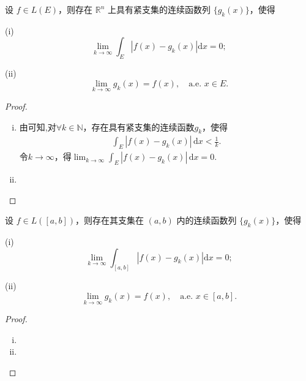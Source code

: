 \documentclass[../../main.tex]{subfiles}
\begin{document}
\begin{corollary}
设 \( f \in L(E) \)，则存在 \( \mathbb{R}^n \) 上具有紧支集的连续函数列 \( \{ g_k(x) \} \)，使得

(i)
\[
\lim_{k \to \infty} \int_E |f(x) - g_k(x)| \mathrm{d}x = 0;
\]

(ii)
\[
\lim_{k \to \infty} g_k(x) = f(x), \quad \text{a.e. } x \in E.
\]
\end{corollary}
\begin{proof}
\begin{enumerate}[(i)]
\item 由可知,对\(\forall k \in \mathbb{N}\)，存在具有紧支集的连续函数\(g_k\)，使得
\begin{align*}
\int_E \left| f(x) - g_k(x) \right| \, \mathrm{d}x < \frac{1}{k}.
\end{align*}
令\(k \to \infty\)，得\(\lim_{k \to \infty} \int_E \left| f(x) - g_k(x) \right| \, \mathrm{d}x = 0\).

\item 
\end{enumerate}

\end{proof}

\begin{corollary}
设 \( f \in L([a,b]) \)，则存在其支集在 \( (a,b) \) 内的连续函数列 \( \{ g_k(x) \} \)，使得

(i)
\[
\lim_{k \to \infty} \int_{[a,b]} |f(x) - g_k(x)| \mathrm{d}x = 0;
\]

(ii)
\[
\lim_{k \to \infty} g_k(x) = f(x), \quad \text{a.e. } x \in [a,b].
\]
\end{corollary}
\begin{proof}
\begin{enumerate}[(i)]
\item 

\item 
\end{enumerate}

\end{proof}
\end{document}
